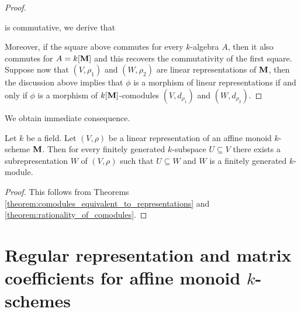 \begin{proof}
\begin{center}
\end{center}
is commutative, we derive that
\begin{center}
\end{center}
Moreover, if the square above commutes for every $k$-algebra $A$, then it also commutes for $A = k[\mathbf{M}]$ and this recovers the commutativity of the first square. Suppose now that $(V,\rho_1)$ and $(W, \rho_2)$ are linear representations of $\mathbf{M}$, then the discussion above implies that $\phi$ is a morphism of linear representations if and only if $\phi$ is a morphism of $k[\mathbf{M}]$-comodules $(V,d_{\rho_1})$ and $(W, d_{\rho_2})$.
\end{proof}
\noindent
We obtain immediate consequence.

\begin{corollary}\label{corollary:each_linear_representation_is_rational}
Let $k$ be a field. Let $(V,\rho)$ be a linear representation of an affine monoid $k$-scheme $\mathbf{M}$. Then for every finitely generated $k$-subspace $U \subseteq V$ there exists a subrepresentation $W$ of $(V,\rho)$ such that $U \subseteq W$ and $W$ is a finitely generated $k$-module.
\end{corollary}
\begin{proof}
This follows from Theorems \ref{theorem:comodules_equivalent_to_representations} and \ref{theorem:rationality_of_comodules}.
\end{proof}

\section{Regular representation and matrix coefficients for affine monoid $k$-schemes}

